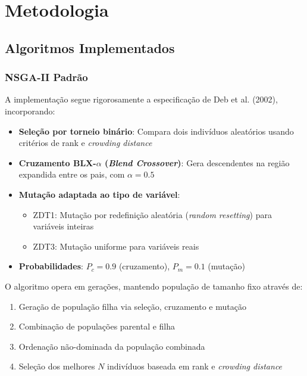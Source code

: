 
\section{Metodologia}

\subsection{Algoritmos Implementados}

\subsubsection{NSGA-II Padrão}

A implementação segue rigorosamente a especificação de Deb et al. (2002), incorporando:

\begin{itemize}
    \item \textbf{Seleção por torneio binário}: Compara dois indivíduos aleatórios usando critérios de rank e \textit{crowding distance}
    \item \textbf{Cruzamento BLX-$\alpha$ (\textit{Blend Crossover})}: Gera descendentes na região expandida entre os pais, com $\alpha = 0.5$
    \item \textbf{Mutação adaptada ao tipo de variável}:
    \begin{itemize}
        \item ZDT1: Mutação por redefinição aleatória (\textit{random resetting}) para variáveis inteiras
        \item ZDT3: Mutação uniforme para variáveis reais
    \end{itemize}
    \item \textbf{Probabilidades}: $P_c = 0.9$ (cruzamento), $P_m = 0.1$ (mutação)
\end{itemize}

O algoritmo opera em gerações, mantendo população de tamanho fixo através de:

\begin{enumerate}
    \item Geração de população filha via seleção, cruzamento e mutação
    \item Combinação de populações parental e filha
    \item Ordenação não-dominada da população combinada
    \item Seleção dos melhores $N$ indivíduos baseada em rank e \textit{crowding distance}
\end{enumerate}

